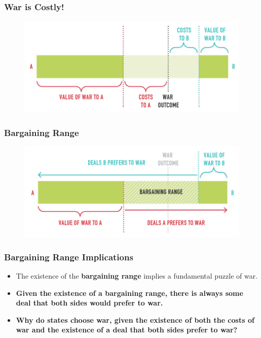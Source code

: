 \documentclass{beamer}
\begin{document}
\begin{frame} 
\frametitle{\LARGE{War is Costly!}}
\begin{figure}[ht!]
	\centering
	\includegraphics[width=\textwidth,height=0.8\textheight,keepaspectratio]{./barg3.png}
\end{figure}
\end{frame}

\begin{frame} 
\frametitle{\LARGE{Bargaining Range}}
\begin{figure}[ht!]
	\centering
	\includegraphics[width=\textwidth,height=0.8\textheight,keepaspectratio]{./barg4.png}
\end{figure}
\end{frame}

\begin{frame} 
	\frametitle{\LARGE{Bargaining Range Implications}}
	\begin{itemize}
		\item The existence of the \textbf{bargaining range} implies a fundamental puzzle of war. \pause
		\item \textbf{Given the existence of a bargaining range, there is always some deal that both sides would prefer to war.} \pause
		\item \textbf{Why do states choose war, given the existence of both the costs of war and the existence of a deal that both sides prefer to war?}
	\end{itemize}
\end{frame}
\end{document}
